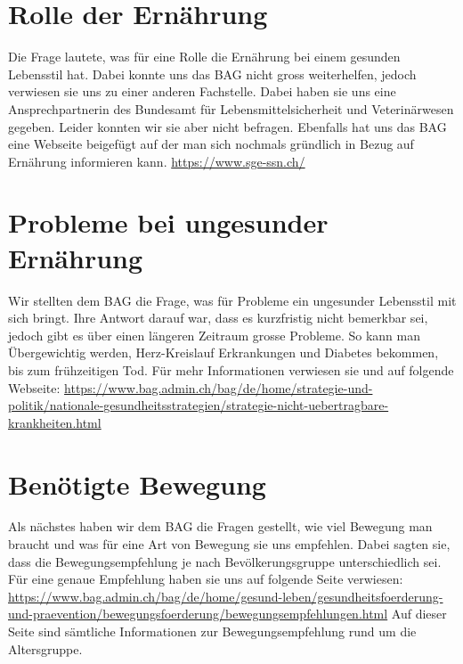 \section{Rolle der Ernährung}
Die Frage lautete, was für eine Rolle die Ernährung bei einem gesunden Lebensstil hat. Dabei konnte uns das BAG nicht gross weiterhelfen, jedoch verwiesen sie uns zu einer anderen Fachstelle. Dabei haben sie uns eine Ansprechpartnerin des  Bundesamt für Lebensmittelsicherheit und Veterinärwesen gegeben. Leider konnten wir sie aber nicht befragen. Ebenfalls hat uns das BAG eine Webseite beigefügt auf der man sich nochmals gründlich in Bezug auf Ernährung informieren kann.
\newline
\url{https://www.sge-ssn.ch/}
\section{Probleme bei ungesunder Ernährung}
Wir stellten dem BAG die Frage, was für Probleme ein ungesunder Lebensstil mit sich bringt. Ihre Antwort darauf war, dass es kurzfristig nicht bemerkbar sei, jedoch gibt es über einen längeren Zeitraum grosse Probleme. So kann man Übergewichtig werden, Herz-Kreislauf Erkrankungen und Diabetes bekommen, bis zum frühzeitigen Tod. Für mehr Informationen verwiesen sie und auf folgende Webseite:
\newline
\url{https://www.bag.admin.ch/bag/de/home/strategie-und-politik/nationale-gesundheitsstrategien/strategie-nicht-uebertragbare-krankheiten.html}
\section{Benötigte Bewegung}
Als nächstes haben wir dem BAG die Fragen gestellt, wie viel Bewegung man braucht und was für eine Art von Bewegung sie uns empfehlen. Dabei sagten sie, dass die Bewegungsempfehlung je nach Bevölkerungsgruppe unterschiedlich sei. Für eine genaue Empfehlung haben sie uns auf folgende Seite verwiesen:
\newline
\url{https://www.bag.admin.ch/bag/de/home/gesund-leben/gesundheitsfoerderung-und-praevention/bewegungsfoerderung/bewegungsempfehlungen.html}
\newline
Auf dieser Seite sind sämtliche Informationen zur Bewegungsempfehlung rund um die Altersgruppe. 
